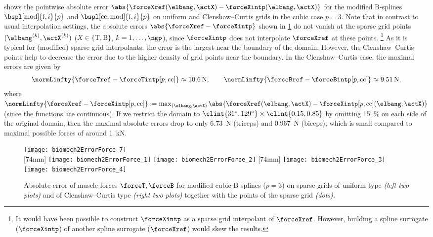  shows the pointwise absolute error
$\abs{\forceXref(\elbang, \actX) - \forceXintp(\elbang, \actX)}$
for the modified B-splines $\bspl[\modified]{l,i}{p}$ and
$\bspl[\cc,\modified]{l,i}{p}$
on uniform and Clenshaw--Curtis grids in the cubic case $p = 3$.
Note that in contrast to usual interpolation settings,
the absolute errors $\abs{\forceXref - \forceXintp}$
shown in \cref{fig:biomech2ErrorForce} do not vanish at the
sparse grid points $(\elbang^{(k)}, \actX^{(k)})$
($X \in \{\mathrm{T}, \mathrm{B}\}$, $k = 1, \dotsc, \ngp$),
since $\forceXintp$ does not interpolate $\forceXref$
at these points.%
\footnote{%
  It would have been possible to construct $\forceXintp$
  as a sparse grid interpolant of $\forceXref$.
  However, building a spline surrogate ($\forceXintp$)
  of another spline surrogate ($\forceXref$) would skew the results.%
}
As it is typical for (modified) sparse grid interpolants,
the error is the largest near the boundary of the domain.
However, the Clenshaw--Curtis points help to decrease the error
due to the higher density of grid points near the boundary.
In the Clenshaw--Curtis case, the maximal errors are given by
\begin{equation}
  \normLinfty{\forceTref - \forceTintp[p,\cc]}
  \approx \SI{10.6}{\newton},\qquad
  \normLinfty{\forceBref - \forceBintp[p,\cc]}
  \approx \SI{9.51}{\newton},
\end{equation}
where $\normLinfty{\forceXref - \forceXintp[p,\cc]}
:= \max_{(\elbang, \actX)}
\abs{\forceXref(\elbang, \actX) - \forceXintp[p,\cc](\elbang, \actX)}$
(since the functions are continuous).
If we restrict the domain to
$\clint{\ang{31}, \ang{129}} \times \clint{0.15, 0.85}$
by omitting \SI{15}{\percent} on each side of the original domain,
then the maximal absolute errors drop to only
\SI{6.73}{\newton} (triceps) and \SI{0.967}{\newton} (biceps),
which is small compared to maximal possible forces of
around \SI{1}{\kilo\newton}.

\begin{figure}
  \texttt{[image: biomech2ErrorForce\_7]}%
  \\[2mm]%
  [74mm]{%
    \texttt{[image: biomech2ErrorForce\_1]}%
    \hfill%
    \texttt{[image: biomech2ErrorForce\_2]}%
  }%
  \hfill%
  [74mm]{%
    \texttt{[image: biomech2ErrorForce\_3]}%
    \hfill%
    \texttt{[image: biomech2ErrorForce\_4]}%
  }%
  \caption[Absolute error of muscle forces]{%
    Absolute error of muscle forces $\forceT, \forceB$ for
    modified cubic B-splines ($p = 3$)
    on sparse grids of uniform type \emph{(left two plots)} and
    of Clenshaw--Curtis type \emph{(right two plots)}
    together with the points of the sparse grid \emph{(dots).}%
  }%
  \label{fig:biomech2ErrorForce}%
\end{figure}

